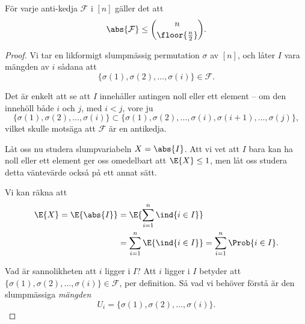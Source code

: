 \documentclass[nobib]{tufte-handout}
\begin{document}
\begin{lemma}
    För varje anti-kedja $\mathcal{F}$ i $[n]$ gäller det att
    $$\abs{\mathcal{F}} \leq \binom{n}{\floor{\frac{n}{2}}}.$$

    \begin{proof}
        Vi tar en likformigt slumpmässig permutation $\sigma$ av $[n]$, och låter $I$ vara mängden av $i$ sådana att
        $$\{\sigma(1), \sigma(2), \ldots, \sigma(i)\} \in \mathcal{F}.$$

        Det är enkelt att se att $I$ innehåller antingen noll eller ett element -- om den innehöll både $i$ och $j$, med $i < j$, vore ju
        $$\{\sigma(1), \sigma(2), \ldots, \sigma(i)\} \subset \{\sigma(1), \sigma(2), \ldots, \sigma(i), \sigma(i+1), \ldots, \sigma(j)\},$$
        vilket skulle motsäga att $\mathcal{F}$ är en antikedja.

        Låt oss nu studera slumpvariabeln $X = \abs{I}$. Att vi vet att $I$ bara kan ha noll eller ett element ger oss omedelbart att $\E{X} \leq 1$, men låt oss studera detta väntevärde också på ett annat sätt.

        Vi kan räkna att
        \begin{align*}
            \E{X} = \E{\abs{I}} &= \E{\sum_{i=1}^{n} \ind{i \in I}}\\
            &= \sum_{i=1}^{n} \E{\ind{i \in I}} = \sum_{i=1}^{n} \Prob{i \in I}.
        \end{align*}

        Vad är sannolikheten att $i$ ligger i $I$? Att $i$ ligger i $I$ betyder att $\{\sigma(1), \sigma(2), \ldots, \sigma(i)\} \in \mathcal{F}$, per definition. Så vad vi behöver förstå är den slumpmässiga \emph{mängden} 
        $$U_i = \{\sigma(1), \sigma(2), \ldots, \sigma(i)\}.$$


\end{proof}
\end{lemma}
\end{document}

